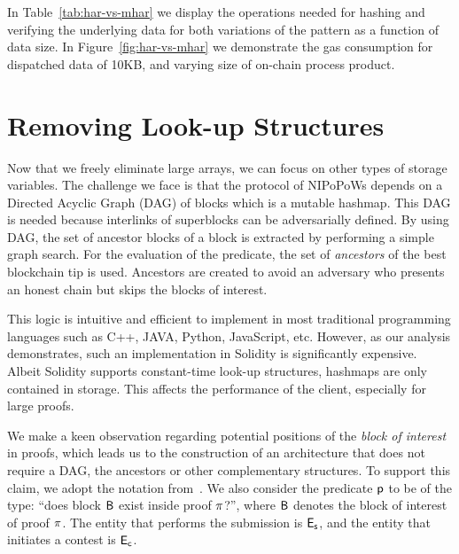 In Table~\ref{tab:har-vs-mhar} we display the operations needed for hashing and
verifying the underlying data for both variations of the pattern as a function
of data size. In Figure~\ref{fig:har-vs-mhar} we demonstrate the gas
consumption for dispatched data of 10KB, and varying size of on-chain
process product.



\section{Removing Look-up Structures}

Now that we freely eliminate large arrays, we can focus on other
types of storage variables. The challenge we face is that the protocol of
NIPoPoWs depends on a Directed Acyclic Graph (DAG) of blocks which is a
mutable hashmap. This DAG is needed because interlinks of superblocks can be
adversarially defined. By using DAG, the set of ancestor blocks of a block is
extracted by performing a simple graph search. For the evaluation of the
predicate, the set of \emph{ancestors} of the best blockchain tip is used.
Ancestors are created to avoid an adversary who presents an honest chain but
skips the blocks of interest.

This logic is intuitive and efficient to implement in most traditional
programming languages such as C++, JAVA, Python, JavaScript, etc. However, as
our analysis demonstrates, such an implementation in Solidity is significantly
expensive. Albeit Solidity supports constant-time look-up structures, hashmaps
are only contained in storage. This affects the performance of the client,
especially for large proofs.

We make a keen observation regarding potential positions of the \emph{block of
interest} in proofs, which leads us to the construction of an architecture that
does not require a DAG, the ancestors or other complementary structures. To
support this claim, we adopt the notation from~\cite{nipopows}. We also
consider the predicate $\mathsf{p}$ to be of the type: ``does block $\mathsf{B}$ exist
inside proof $\mathsf{\pi}$?'', where $\mathsf{B}$ denotes the block of interest of proof
$\mathsf{\pi}$. The entity that performs the submission is $\mathsf{E_{s}}$, and the entity that
initiates a contest is $\mathsf{E_{c}}$.

